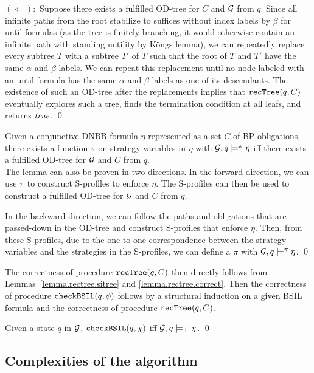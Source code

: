 \noindent $(\Leftarrow):$
Suppose there exists a fulfilled OD-tree for $C$ and ${\cal G}$ from $q$.
Since all infinite paths from the root stabilize to suffices
without index labels by $\beta$ for until-formulas (as the tree is finitely branching, it would otherwise contain an infinite path with standing untility by K\"ongs lemma),
we can repeatedly replace every subtree $T$ with a subtree $T'$ of $T$
such that the root of $T$ and $T'$ have the same $\alpha$ and $\beta$
labels.
We can repeat this replacement until no node labeled with 
an until-formula has the same $\alpha$ and $\beta$ labels as
one of its descendants.
The existence of such an OD-tree after the replacements
implies that $\mbox{\tt recTree}(q,C)$ eventually
explores such a tree, finds the termination condition at all leafs,
and returns $\mbox{\em true}$.
\qed 



{\lemma \label{lemma.rectree.correct}
Given a conjunctive DNBB-formula $\eta$ represented 
as a set $C$ of BP-obligations, 
there exists a function $\pi$ on strategy variables in $\eta$ 
with ${\cal G},q\models^\pi \eta$ iff
there exists a fulfilled OD-tree for ${\cal G}$ and $C$ from $q$.
}
\\\pf
The lemma can also be proven in two directions. 
In the forward direction, we can use $\pi$ to construct 
S-profiles to enforce $\eta$. 
The S-profiles can then be used to construct a fulfilled OD-tree 
for ${\cal G}$ and $C$ from $q$. 

In the backward direction, we can follow the paths and 
obligations that are passed-down in the OD-tree and 
construct S-profiles that enforce $\eta$.  
Then, from these S-profiles, due to the one-to-one correspondence %
between the strategy variables and the strategies in the S-profiles, 
we can define a $\pi$ with ${\cal G},q\models^\pi \eta$.  
% 
\qed 


The correctness of procedure $\mbox{\tt recTree}(q,C)$
then directly follows from Lemmas~\ref{lemma.rectree.sitree} and
\ref{lemma.rectree.correct}.
Then the correctness of procedure
$\mbox{\tt checkBSIL}(q,\phi)$ follows by a structural induction on a given BSIL formula
and the correctness of procedure
$\mbox{\tt recTree}(q,C)$.

{\lemma \label{lemma.alg.correct}
Given a state $q$ in ${\cal G}$, 
$\mbox{\tt checkBSIL}(q,\chi)$
iff
${\cal G},q\models_\perp \chi$.
}
\qed


\subsection{Complexities of the algorithm \label{subsec.alg.pspace}}

